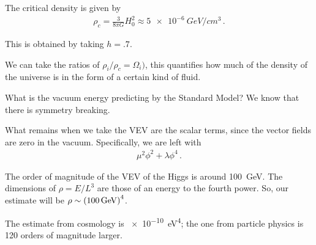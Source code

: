 \documentclass[main.tex]{subfiles}
\begin{document}
The critical density is given by 
%
\begin{align}
\rho_{c} = \frac{3}{8 \pi G} H_0^2 \approx \SI{5e-6}{GeV / cm^3}
\,.
\end{align}

This is obtained by taking \(h = \num{.7}\). 

We can take the ratios of \(\rho_{i} / \rho_{c} = \Omega_{i})\), this quantifies how much of the density of the universe is in the form of a certain kind of fluid. 

What is the vacuum energy predicting by the Standard Model? 
We know that there is symmetry breaking. 

What remains when we take the VEV are the scalar terms, since the vector fields are zero in the vacuum. Specifically, we are left with 
%
\begin{align}
\mu^2 \phi^2 + \lambda \phi^{4}
\,.
\end{align}

The order of magnitude of the VEV of the Higgs is around \SI{100}{GeV}. 
The dimensions of \(\rho = E / L^3\) are those of an energy to the fourth power. So, our estimate will be \(\rho \sim \qty(\SI{100}{GeV})^{4}\). 

The estimate from cosmology is \SI{e-10}{eV^{4}}; the one from particle physics is 120 orders of magnitude larger.
\end{document}
